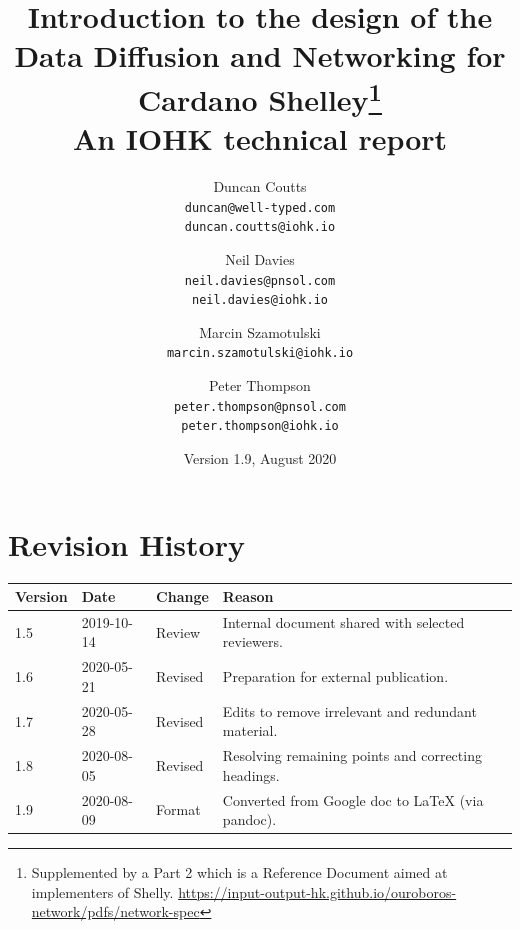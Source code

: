 \documentclass[11pt,a4paper]{article}
\begin{document}

\title{Introduction to the design of the
       Data Diffusion and Networking for
       Cardano Shelley\footnote{Supplemented by a Part 2 which is a
       Reference Document aimed at implementers of Shelly.
  \url{https://input-output-hk.github.io/ouroboros-network/pdfs/network-spec}} \\
       {\large \sc An IOHK technical report}
  }
\date{Version 1.9, August 2020}
\author{Duncan Coutts      \\ {\small \texttt{duncan@well-typed.com}} \\
                              {\small \texttt{duncan.coutts@iohk.io}}
   \and Neil Davies        \\ {\small \texttt{neil.davies@pnsol.com}} \\
                              {\small \texttt{neil.davies@iohk.io}}
   \and Marcin Szamotulski \\ {\small \texttt{marcin.szamotulski@iohk.io}}
   \and Peter Thompson     \\ {\small \texttt{peter.thompson@pnsol.com}} \\
                              {\small \texttt{peter.thompson@iohk.io}}
   }

\maketitle

\tableofcontents
\listoftables

\section{Revision History}
\label{revision-history}

\begin{longtable}[]{@{}llll@{}}
\toprule
\textbf{Version} & \textbf{Date} & \textbf{Change} &
\textbf{Reason}\tabularnewline
\midrule
\endhead
1.5 & 2019-10-14 & Review & Internal document shared with selected reviewers.\\
1.6 & 2020-05-21 & Revised & Preparation for external publication.\\
1.7 & 2020-05-28 & Revised & Edits to remove irrelevant and redundant
material.\\
1.8 & 2020-08-05 & Revised & Resolving remaining points and correcting
headings.\\
1.9 & 2020-08-09 & Format & Converted from Google doc to LaTeX (via pandoc).\\
\bottomrule
\end{longtable}
\end{document}
